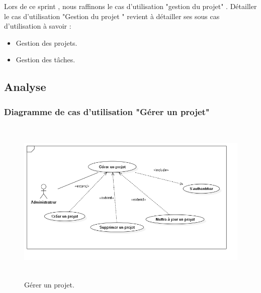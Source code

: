 Lors de ce sprint , nous  raffinons le cas d’utilisation "gestion du projet" .
D\'{e}tailler le cas d'utilisation "Gestion du projet " revient \`{a} d\'{e}tailler
ses sous cas d'utilisation \`{a} savoir : \newline
\begin{itemize}
  \item {Gestion des projets.}
  \item {Gestion des t\^{a}ches.}
\end{itemize}



\subsection{Analyse}

\subsubsection{ Diagramme de cas d'utilisation "G\'{e}rer un projet"}

\begin{figure}[H]
\center
\includegraphics[width=13cm,height=8cm]{./figures/ucP.png}
\caption{G\'{e}rer un projet.}

\end{figure}

